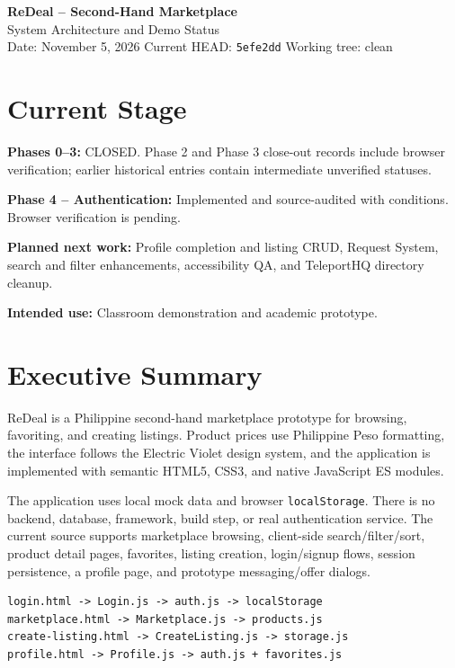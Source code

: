 \documentclass[10pt]{article}
\newcommand{\code}[1]{\texttt{#1}}
\begin{document}
\begin{center}
  {\Huge\bfseries\color{violet} ReDeal -- Second-Hand Marketplace}\\[3pt]
  {\large\color{secondarytext} System Architecture and Demo Status}\\[8pt]
  {\small Date: November 5, 2026 \quad\textbullet\quad Current HEAD: \code{5efe2dd} \quad\textbullet\quad Working tree: clean}
\end{center}

\section{Current Stage}
\begin{stagebox}
\textbf{Phases 0--3:} CLOSED. Phase 2 and Phase 3 close-out records include browser verification; earlier historical entries contain intermediate unverified statuses.

\textbf{Phase 4 -- Authentication:} Implemented and source-audited with conditions. Browser verification is pending.

\textbf{Planned next work:} Profile completion and listing CRUD, Request System, search and filter enhancements, accessibility QA, and TeleportHQ directory cleanup.

\textbf{Intended use:} Classroom demonstration and academic prototype.
\end{stagebox}

\section{Executive Summary}
ReDeal is a Philippine second-hand marketplace prototype for browsing, favoriting, and creating listings. Product prices use Philippine Peso formatting, the interface follows the Electric Violet design system, and the application is implemented with semantic HTML5, CSS3, and native JavaScript ES modules.

The application uses local mock data and browser \code{localStorage}. There is no backend, database, framework, build step, or real authentication service. The current source supports marketplace browsing, client-side search/filter/sort, product detail pages, favorites, listing creation, login/signup flows, session persistence, a profile page, and prototype messaging/offer dialogs.

\begin{lstlisting}
login.html -> Login.js -> auth.js -> localStorage
marketplace.html -> Marketplace.js -> products.js
create-listing.html -> CreateListing.js -> storage.js
profile.html -> Profile.js -> auth.js + favorites.js
\end{lstlisting}
\end{document}
